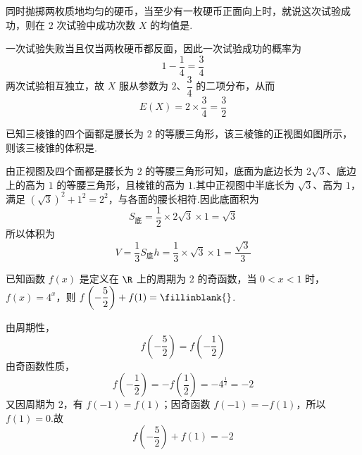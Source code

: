\begin{problem}
同时抛掷两枚质地均匀的硬币，当至少有一枚硬币正面向上时，就说这次试验成功，则在 \(2\) 次试验中成功次数 \(X\) 的均值是\fillinblank{}.

\begin{solution}
一次试验失败当且仅当两枚硬币都反面，因此一次试验成功的概率为
\[
1-\frac14=\frac34
\]
两次试验相互独立，故 \(X\) 服从参数为 \(2\)、\(\dfrac34\) 的二项分布，从而
\[
E(X)=2\times\frac34=\frac32
\]
\end{solution}
\end{problem}



\begin{problem}
已知三棱锥的四个面都是腰长为 \(2\) 的等腰三角形，该三棱锥的正视图如图所示，则该三棱锥的体积是\fillinblank{}.


\begin{solution}
由正视图及四个面都是腰长为 \(2\) 的等腰三角形可知，底面为底边长为 \(2\sqrt3\)、底边上的高为 \(1\) 的等腰三角形，且棱锥的高为 \(1\).其中正视图中半底长为 \(\sqrt3\)、高为 \(1\)，满足 \((\sqrt3)^2+1^2=2^2\)，与各面的腰长相符.因此底面积为
\[
S_{\text{底}}=\frac12\times2\sqrt3\times1=\sqrt3
\]
所以体积为
\[
V=\frac13S_{\text{底}}h=\frac13\times\sqrt3\times1=\frac{\sqrt3}{3}
\]
\end{solution}
\end{problem}



\begin{problem}
已知函数 \(f(x)\) 是定义在 \(\R\) 上的周期为 \(2\) 的奇函数，当 \(0<x<1\) 时，\(f(x)=4^x\)，则 \(f\left(-\dfrac52\right)+f(1)=\fillinblank{}\).

\begin{solution}
由周期性，
\[
f\left(-\dfrac52\right)=f\left(-\dfrac12\right)
\]
由奇函数性质，
\[
f\left(-\frac12\right)=-f\left(\frac12\right)=-4^{\frac{1}{2}}=-2
\]
又因周期为 \(2\)，有 \(f(-1)=f(1)\)；因奇函数 \(f(-1)=-f(1)\)，所以 \(f(1)=0\).故
\[
f\left(-\frac52\right)+f(1)=-2
\]
\end{solution}
\end{problem}



